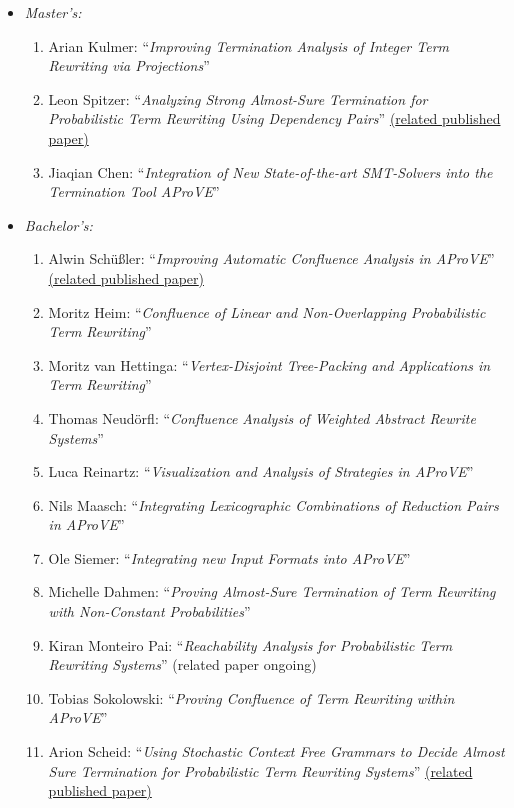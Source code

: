 \documentclass[letterpaper,11pt]{article}
\begin{document}
    \begin{itemize}
      \item \textit{Master's:}
      \begin{enumerate}
        \item Arian Kulmer: ``\textit{Improving Termination Analysis of Integer Term Rewriting via Projections}''
        \item Leon Spitzer: ``\textit{Analyzing Strong Almost-Sure Termination for Probabilistic Term Rewriting Using Dependency Pairs}'' \href{https://jckassing.com/publication/2025-09-01}{(\textcolor{BrickRed}{related published paper})}
        \item Jiaqian Chen: ``\textit{Integration of New State-of-the-art SMT-Solvers into the Termination Tool AProVE}''
      \end{enumerate}
      \item \textit{Bachelor's:}
      \begin{enumerate}
        \item Alwin Schüßler: ``\textit{Improving Automatic Confluence Analysis in AProVE}'' \href{https://jckassing.com/publication/2026-07-03}{(\textcolor{BrickRed}{related published paper})}
        \item Moritz Heim: ``\textit{Confluence of Linear and Non-Overlapping Probabilistic Term Rewriting}''
        \item Moritz van Hettinga: ``\textit{Vertex-Disjoint Tree-Packing and Applications in Term Rewriting}''
        \item Thomas Neudörfl: ``\textit{Confluence Analysis of Weighted Abstract Rewrite Systems}''
        \item Luca Reinartz: ``\textit{Visualization and Analysis of Strategies in AProVE}''
        \item Nils Maasch: ``\textit{Integrating Lexicographic Combinations of Reduction Pairs in AProVE}''
        \item Ole Siemer: ``\textit{Integrating new Input Formats into AProVE}''
        \item Michelle Dahmen: ``\textit{Proving Almost-Sure Termination of Term Rewriting with Non-Constant Probabilities}''
        \item Kiran Monteiro Pai: ``\textit{Reachability Analysis for Probabilistic Term Rewriting Systems}'' (\textcolor{BrickRed}{related paper ongoing})
        \item Tobias Sokolowski: ``\textit{Proving Confluence of Term Rewriting within AProVE}''
        \item Arion Scheid: ``\textit{Using Stochastic Context Free Grammars to Decide Almost Sure Termination for Probabilistic Term Rewriting Systems}'' \href{https://jckassing.com/publication/2026-07-04}{(\textcolor{BrickRed}{related published paper})}

\end{enumerate}
\end{itemize}
\end{document}
